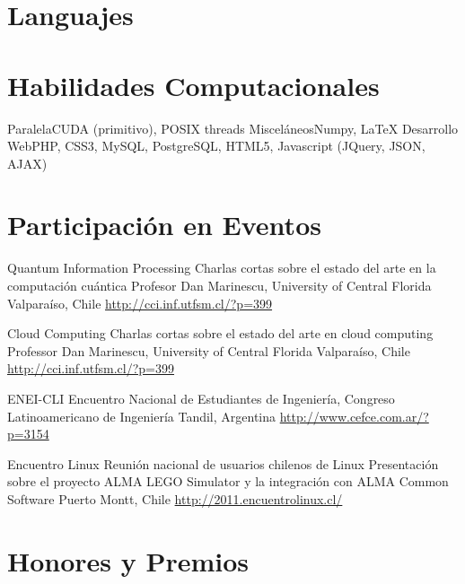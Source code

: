 \documentclass[11pt,a4paper]{moderncv}
\begin{document}
\section{Languajes}

\section{Habilidades Computacionales}
           {Paralela}{CUDA (primitivo), POSIX threads}
           {Misceláneos}{Numpy, \LaTeX}
           {Desarrollo Web}{PHP, CSS3, MySQL, PostgreSQL, HTML5, Javascript (JQuery, JSON, AJAX)}

\section{Participación en Eventos}

        {Quantum Information Processing}
        {Charlas cortas sobre el estado del arte en la computación cuántica}
        {Profesor Dan Marinescu, University of Central Florida}
        {Valparaíso, Chile}
        {\url{http://cci.inf.utfsm.cl/?p=399}}
        
        {Cloud Computing}
        {Charlas cortas sobre el estado del arte en cloud computing}
        {Professor Dan Marinescu, University of Central Florida}
        {Valparaíso, Chile}
        {\url{http://cci.inf.utfsm.cl/?p=399}}

        {ENEI-CLI}
        {Encuentro Nacional de Estudiantes de Ingeniería, Congreso Latinoamericano de Ingeniería}{}
        {Tandil, Argentina}
        {\url{http://www.cefce.com.ar/?p=3154}}

        {Encuentro Linux}
        {Reunión nacional de usuarios chilenos de Linux}
        {Presentación sobre el proyecto ALMA LEGO Simulator y la integración con ALMA Common Software}
        {Puerto Montt, Chile}
        {\url{http://2011.encuentrolinux.cl/}}
        
\section{Honores y Premios}

\end{document}
